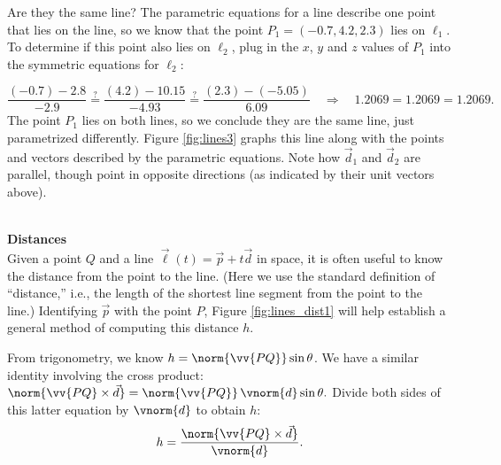 {Are they the same line? The parametric equations for a line describe one point that lies on the line, so we know that the point $P_1 = (-0.7,4.2,2.3)$ lies on $\ell_1$. To determine if this point also lies on $\ell_2$, plug in the $x$, $y$ and $z$ values of $P_1$ into the symmetric equations for $\ell_2$:

\small
$$\frac{(-0.7)-2.8}{-2.9} \stackrel{?}{=} \frac{(4.2)-10.15}{-4.93} \stackrel{?}{=} \frac{(2.3)-(-5.05)}{6.09} \quad \Rightarrow \quad 1.2069=1.2069=1.2069.$$
\normalsize
{}
The point $P_1$ lies on both lines, so we conclude they are the same line, just parametrized differently. Figure \ref{fig:lines3} graphs this line along with the points and vectors described by the parametric equations. Note how $\vec d_1$ and $\vec d_2$ are parallel, though point in opposite directions (as indicated by their unit vectors above). 
}\\

\noindent\textbf{\large Distances}\\

Given a point $Q$ and a line $\vec\ell(t) = \vec p+t\vec d$ in space, it is often useful to know the distance from the point to the line. (Here we use the standard definition of ``distance,'' i.e., the length of the shortest line segment from the point to the line.) Identifying $\vec p$ with the point $P$, Figure \ref{fig:lines_dist1} will help establish a general method of computing this distance $h$.


From trigonometry, we know $h = \norm{\vv{PQ}}\sin\theta$. We have a similar identity involving the cross product: $\norm{\vv{PQ}\times \vec d} = \norm{\vv{PQ}}\, \vnorm{d}\sin\theta.$ Divide both sides of this latter equation by $\vnorm{d}$ to obtain $h$:
\begin{equation}
h = \frac{\norm{\vv{PQ}\times \vec d}}{\vnorm{d}}.
\label{eq:lines2}
\end{equation}

